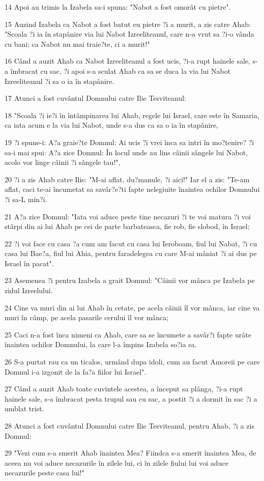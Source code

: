 \par 14 Apoi au trimis la Izabela sa-i spuna: "Nabot a fost omorât cu pietre".
\par 15 Auzind Izabela ca Nabot a fost batut eu pietre ?i a murit, a zis catre Ahab: "Scoala ?i ia în stapânire via lui Nabot Izreeliteanul, care n-a vrut sa ?i-o vânda cu bani; ca Nabot nu mai traie?te, ci a murit!"
\par 16 Când a auzit Ahab ca Nabot Izreeliteanul a fost ucis, ?i-a rupt hainele sale, s-a îmbracat cu sac, ?i apoi s-a sculat Ahab ca sa se duca la via lui Nabot Izreeliteanul ?i sa o ia în stapânire.
\par 17 Atunci a fost cuvântul Domnului catre Ilie Tesviteanul:
\par 18 "Scoala ?i ie?i în întâmpinarea lui Ahab, regele lui Israel, care este în Samaria, ca iata acum e la via lui Nabot, unde s-a dus ca sa o ia în stapânire,
\par 19 ?i spune-i: A?a graie?te Domnul: Ai ucis ?i vrei înca sa intri în mo?tenire? ?i sa-i mai spui: A?a zice Domnul: În locul unde au lins câinii sângele lui Nabot, acolo vor linge câinii ?i sângele tau!",
\par 20 ?i a zis Ahab catre Ilie: "M-ai aflat, du?manule, ?i aici!" Iar el a zis: "Te-am aflat, caci te-ai încumetat sa savâr?e?ti fapte nelegiuite înaintea ochilor Domnului ?i sa-L min?i.
\par 21 A?a zice Domnul: "Iata voi aduce peste tine necazuri ?i te voi matura ?i voi stârpi din ai lui Ahab pe cei de parte barbateasca, fie rob, fie slobod, în Israel;
\par 22 ?i voi face cu casa ?a cum am facut cu casa lui Ieroboam, fiul lui Nabat, ?i cu casa lui Bae?a, fiul lui Ahia, pentru faradelegea cu care M-ai mâniat ?i ai dus pe Israel în pacat".
\par 23 Asemenea ?i pentru Izabela a grait Domnul: "Câinii vor mânca pe Izabela pe zidul Izreelului.
\par 24 Cine va muri din ai lui Ahab în cetate, pe acela câinii îl vor mânca, iar cine va muri în câmp, pe acela pasarile cerului îl vor mânca;
\par 25 Caci n-a fost înca nimeni ca Ahab, care sa se încumete a savâr?i fapte urâte înaintea ochilor Domnului, la care l-a împins Izabela so?ia sa.
\par 26 S-a purtat rau ca un ticalos, urmând dupa idoli, cum au facut Amoreii pe care Domnul i-a izgonit de la fa?a fiilor lui Israel".
\par 27 Când a auzit Ahab toate cuvintele acestea, a început sa plânga, ?i-a rupt hainele sale, s-a îmbracat pesta trupul sau cu sac, a postit ?i a dormit în sac ?i a umblat trist.
\par 28 Atunci a fost cuvântul Domnului catre Ilie Tesviteanul, pentru Ahab, ?i a zis Domnul:
\par 29 "Vezi cum s-a smerit Ahab înaintea Mea? Fiindca s-a smerit înaintea Mea, de aceea nu voi aduce necazurile în zilele lui, ci în zilele fiului lui voi aduce necazurile peste casa lui!"

